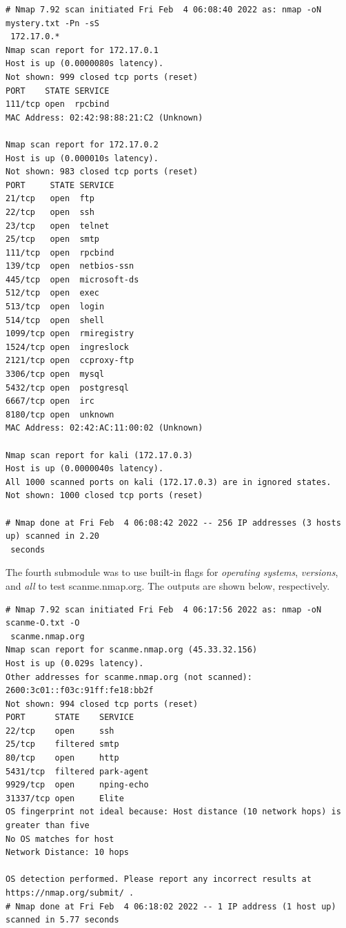 \documentclass[12pt]{article}
\renewcommand{\footnotesize}{\fontsize{8pt}{10pt}\selectfont}
\begin{document}
\begin{tcolorbox}[colback=CrispBlue!5!white,colframe=CrispBlue!75!black,title=Output of \texttt{nmap -oN mystery.txt -Pn -sS 172.17.0.*}]\footnotesize
\begin{verbatim}
# Nmap 7.92 scan initiated Fri Feb  4 06:08:40 2022 as: nmap -oN mystery.txt -Pn -sS
 172.17.0.*
Nmap scan report for 172.17.0.1
Host is up (0.0000080s latency).
Not shown: 999 closed tcp ports (reset)
PORT    STATE SERVICE
111/tcp open  rpcbind
MAC Address: 02:42:98:88:21:C2 (Unknown)

Nmap scan report for 172.17.0.2
Host is up (0.000010s latency).
Not shown: 983 closed tcp ports (reset)
PORT     STATE SERVICE
21/tcp   open  ftp
22/tcp   open  ssh
23/tcp   open  telnet
25/tcp   open  smtp
111/tcp  open  rpcbind
139/tcp  open  netbios-ssn
445/tcp  open  microsoft-ds
512/tcp  open  exec
513/tcp  open  login
514/tcp  open  shell
1099/tcp open  rmiregistry
1524/tcp open  ingreslock
2121/tcp open  ccproxy-ftp
3306/tcp open  mysql
5432/tcp open  postgresql
6667/tcp open  irc
8180/tcp open  unknown
MAC Address: 02:42:AC:11:00:02 (Unknown)

Nmap scan report for kali (172.17.0.3)
Host is up (0.0000040s latency).
All 1000 scanned ports on kali (172.17.0.3) are in ignored states.
Not shown: 1000 closed tcp ports (reset)

# Nmap done at Fri Feb  4 06:08:42 2022 -- 256 IP addresses (3 hosts up) scanned in 2.20
 seconds
\end{verbatim}
\end{tcolorbox}

The fourth submodule was to use built-in flags for \textit{operating systems}, \textit{versions}, and \textit{all} to test scanme.nmap.org. The outputs are shown below, respectively.

\begin{tcolorbox}[colback=CrispBlue!5!white,colframe=CrispBlue!75!black,title=Output of \texttt{nmap -oN scanme-O.txt -O scanme.nmap.org}]\footnotesize
\begin{verbatim}
# Nmap 7.92 scan initiated Fri Feb  4 06:17:56 2022 as: nmap -oN scanme-O.txt -O
 scanme.nmap.org
Nmap scan report for scanme.nmap.org (45.33.32.156)
Host is up (0.029s latency).
Other addresses for scanme.nmap.org (not scanned): 2600:3c01::f03c:91ff:fe18:bb2f
Not shown: 994 closed tcp ports (reset)
PORT      STATE    SERVICE
22/tcp    open     ssh
25/tcp    filtered smtp
80/tcp    open     http
5431/tcp  filtered park-agent
9929/tcp  open     nping-echo
31337/tcp open     Elite
OS fingerprint not ideal because: Host distance (10 network hops) is greater than five
No OS matches for host
Network Distance: 10 hops

OS detection performed. Please report any incorrect results at https://nmap.org/submit/ .
# Nmap done at Fri Feb  4 06:18:02 2022 -- 1 IP address (1 host up) scanned in 5.77 seconds
\end{verbatim}
\end{tcolorbox}
\end{document}
